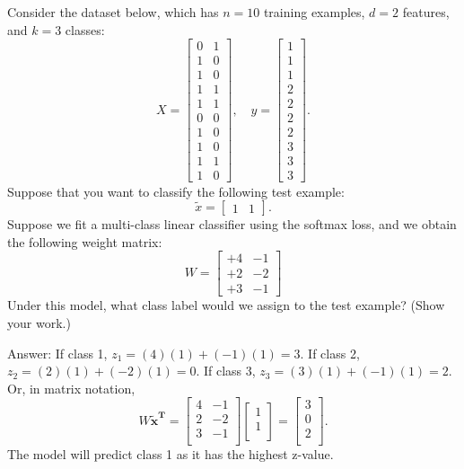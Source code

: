 \documentclass{article}
\newcommand{\blu}[1]{{\textcolor{blu}{#1}}}
\newcommand{\gre}[1]{\textcolor{gre}{#1}}
\newcommand\ans[1]{\par\gre{Answer: #1}}
\let\ask\blu
\begin{document}
Consider the dataset below, which has $n=10$ training examples, $d=2$ features, and $k=3$ classes:
\[
X = \begin{bmatrix}0 & 1\\1 & 0\\ 1 & 0\\ 1 & 1\\ 1 & 1\\ 0 & 0\\  1 & 0\\  1 & 0\\  1 & 1\\  1 &0\end{bmatrix}, \quad y = \begin{bmatrix}1\\1\\1\\2\\2\\2\\2\\3\\3\\3\end{bmatrix}.
\]
Suppose that you want to classify the following test example:
\[
\tilde{x} = \begin{bmatrix}1 & 1\end{bmatrix}.
\]
Suppose we fit a multi-class linear classifier using the softmax loss, and we obtain the following weight matrix:
\[
W =
\begin{bmatrix}
+4 & -1\\
+2 & -2\\
+3 & -1
\end{bmatrix}
\]
\ask{Under this model, what class label would we assign to the test example? (Show your work.)}
\ans{If class 1, \( z_1 = (4)(1) + (-1)(1) = 3 \). \newline
If class 2, \( z_2 = (2)(1) + (-2)(1) = 0 \). \newline
If class 3, \( z_3 = (3)(1) + (-1)(1) = 2 \). \newline
\newline
Or, in matrix notation,
\[
W \mathbf{\tilde{x}^T} = 
\begin{bmatrix}
4 & -1 \\
2 & -2 \\
3 & -1 \\
\end{bmatrix}
\begin{bmatrix}
1 \\
1 \\
\end{bmatrix} =
\begin{bmatrix}
3 \\
0 \\
2 \\
\end{bmatrix}.
\]
The model will predict class 1 as it has the highest  z-value.}
\end{document}
